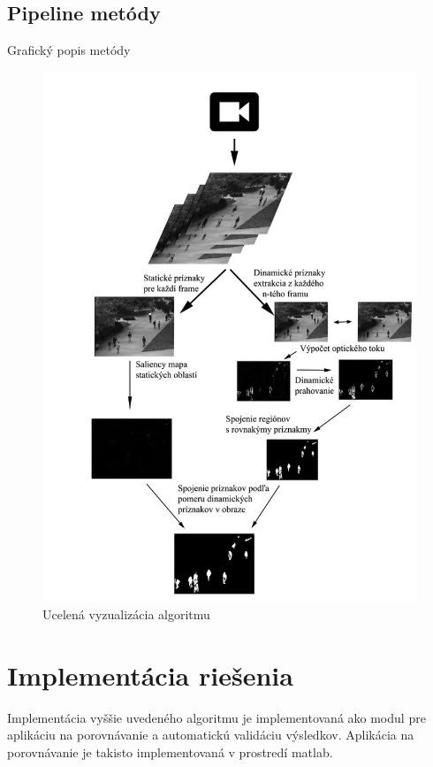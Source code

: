 \subsection{Pipeline metódy}
  Grafický popis metódy

  \begin{figure}[H]
    \centering
    \includegraphics[width=15cm]{pics/workflow.jpg}
    \caption{Ucelená vyzualizácia algoritmu}
    \vspace{10mm}
  \end{figure}

\section{Implementácia riešenia}
Implementácia vyššie uvedeného algoritmu je implementovaná ako modul pre aplikáciu na porovnávanie a  automatickú validáciu výsledkov.
Aplikácia na porovnávanie je takisto implementovaná v prostredí matlab.

